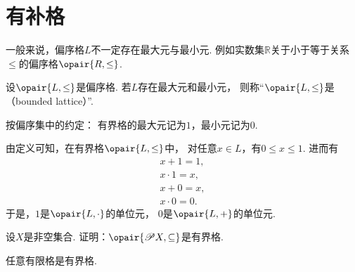 \section{有补格}
一般来说，偏序格\(L\)不一定存在最大元与最小元.
例如实数集\(\mathbb{R}\)关于小于等于关系\(\leq\)的偏序格\(\opair{R,\leq}\).

\begin{definition}
设\(\opair{L,\leq}\)是偏序格.
若\(L\)存在最大元和最小元，
则称“\(\opair{L,\leq}\)是（bounded lattice）”.
\end{definition}

按偏序集中的约定：
有界格的最大元记为\(1\)，最小元记为\(0\).

由定义可知，在有界格\(\opair{L,\leq}\)中，
对任意\(x \in L\)，有\(0 \leq x \leq 1\).
进而有\begin{gather*}
	x + 1 = 1, \\
	x \cdot 1 = x, \\
	x + 0 = x, \\
	x \cdot 0 = 0.
\end{gather*}
于是，\(1\)是\(\opair{L,\cdot}\)的单位元，
\(0\)是\(\opair{L,+}\)的单位元.

\begin{example}
设\(X\)是非空集合.
证明：\(\opair{\Powerset X,\subseteq}\)是有界格.
\end{example}

\begin{proposition}
任意有限格是有界格.
\end{proposition}
